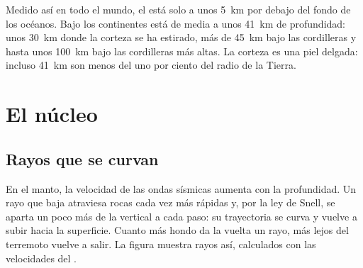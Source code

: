 Medido así en todo el mundo, el  está solo a unos \qty{5}{km} por debajo
del fondo de los océanos. Bajo los continentes está de media a unos
\qty{41}{km} de profundidad: unos \qty{30}{km} donde la corteza se ha
estirado, más de \qty{45}{km} bajo las cordilleras y hasta unos
\qty{100}{km} bajo las cordilleras más altas. La corteza es una piel
delgada: incluso \qty{41}{km} son menos del uno por ciento del radio de la
Tierra.

\section{El núcleo}

\subsection{Rayos que se curvan}

En el manto, la velocidad de las ondas sísmicas aumenta con la profundidad.
Un rayo que baja atraviesa rocas cada vez más rápidas y, por la ley de Snell,
se aparta un poco más de la vertical a cada paso: su trayectoria se curva y
vuelve a subir hacia la superficie. Cuanto más hondo da la vuelta un rayo,
más lejos del terremoto vuelve a salir. La figura muestra rayos así,
calculados con las velocidades del .

